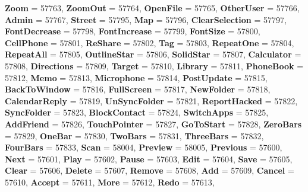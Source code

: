\begin{DoxyCompactItemize}
\newline
{\bfseries Zoom} = 57763, 
{\bfseries Zoom\+Out} = 57764, 
{\bfseries Open\+File} = 57765, 
{\bfseries Other\+User} = 57766, 
\newline
{\bfseries Admin} = 57767, 
{\bfseries Street} = 57795, 
{\bfseries Map} = 57796, 
{\bfseries Clear\+Selection} = 57797, 
\newline
{\bfseries Font\+Decrease} = 57798, 
{\bfseries Font\+Increase} = 57799, 
{\bfseries Font\+Size} = 57800, 
{\bfseries Cell\+Phone} = 57801, 
\newline
{\bfseries Re\+Share} = 57802, 
{\bfseries Tag} = 57803, 
{\bfseries Repeat\+One} = 57804, 
{\bfseries Repeat\+All} = 57805, 
\newline
{\bfseries Outline\+Star} = 57806, 
{\bfseries Solid\+Star} = 57807, 
{\bfseries Calculator} = 57808, 
{\bfseries Directions} = 57809, 
\newline
{\bfseries Target} = 57810, 
{\bfseries Library} = 57811, 
{\bfseries Phone\+Book} = 57812, 
{\bfseries Memo} = 57813, 
\newline
{\bfseries Microphone} = 57814, 
{\bfseries Post\+Update} = 57815, 
{\bfseries Back\+To\+Window} = 57816, 
{\bfseries Full\+Screen} = 57817, 
\newline
{\bfseries New\+Folder} = 57818, 
{\bfseries Calendar\+Reply} = 57819, 
{\bfseries Un\+Sync\+Folder} = 57821, 
{\bfseries Report\+Hacked} = 57822, 
\newline
{\bfseries Sync\+Folder} = 57823, 
{\bfseries Block\+Contact} = 57824, 
{\bfseries Switch\+Apps} = 57825, 
{\bfseries Add\+Friend} = 57826, 
\newline
{\bfseries Touch\+Pointer} = 57827, 
{\bfseries Go\+To\+Start} = 57828, 
{\bfseries Zero\+Bars} = 57829, 
{\bfseries One\+Bar} = 57830, 
\newline
{\bfseries Two\+Bars} = 57831, 
{\bfseries Three\+Bars} = 57832, 
{\bfseries Four\+Bars} = 57833, 
{\bfseries Scan} = 58004, 
\newline
{\bfseries Preview} = 58005, 
{\bfseries Previous} = 57600, 
{\bfseries Next} = 57601, 
{\bfseries Play} = 57602, 
\newline
{\bfseries Pause} = 57603, 
{\bfseries Edit} = 57604, 
{\bfseries Save} = 57605, 
{\bfseries Clear} = 57606, 
\newline
{\bfseries Delete} = 57607, 
{\bfseries Remove} = 57608, 
{\bfseries Add} = 57609, 
{\bfseries Cancel} = 57610, 
\newline
{\bfseries Accept} = 57611, 
{\bfseries More} = 57612, 
{\bfseries Redo} = 57613, 

\end{DoxyCompactItemize}
